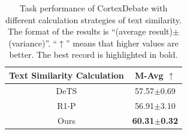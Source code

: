 \begin{table}
  \centering
  \setlength{\tabcolsep}{3mm}
\begin{tabular}{cc}
\toprule
\multicolumn{1}{c}{Text Similarity Calculation}     & M-Avg $\uparrow$ \\ \midrule
DeTS     & 57.57{\tiny $\pm$0.69}         \\
R1-P                & 56.91{\tiny $\pm$3.10}         \\
Ours & \textbf{60.31{\tiny $\pm$0.32}}     \\  \bottomrule
\end{tabular}
  \caption{\label{text_similarity}
   Task performance of CortexDebate with different calculation strategies of text similarity. The format of the results is ``(average result)$\pm$(variance)''. ``$\uparrow$'' means that higher values are better. The best record is highlighted in bold.
  }
\end{table}